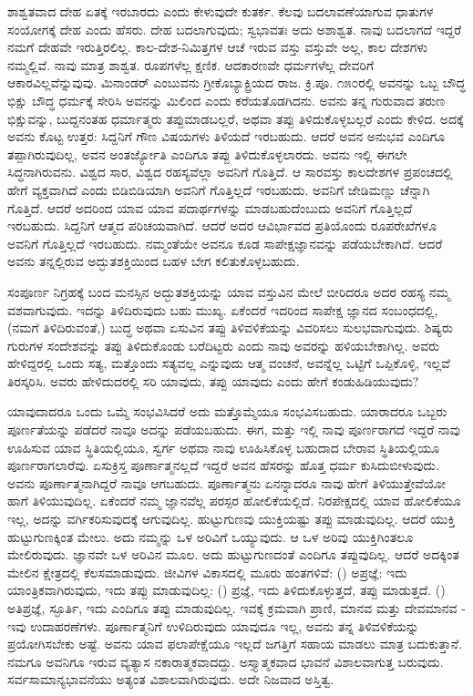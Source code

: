 ಶಾಶ್ವತವಾದ ದೇಹ ಏತಕ್ಕೆ ಇರಬಾರದು ಎಂದು ಕೇಳುವುದೇ ಕುತರ್ಕ. ಕೆಲವು ಬದಲಾವಣೆಯಾಗುವ ಧಾತುಗಳ ಸಂಯೋಗಕ್ಕೆ ದೇಹ ಎಂದು ಹೆಸರು. ದೇಹ ಬದಲಾಗುವುದು; ಸ್ವಭಾವತಃ ಅದು ಅಶಾಶ್ವತ. ನಾವು ಬದಲಾಗದೆ ಇದ್ದರೆ ನಮಗೆ ದೇಹವೇ ಇರುತ್ತಿರಲಿಲ್ಲ. ಕಾಲ-ದೇಶ-ನಿಮಿತ್ತಗಳ ಆಚೆ ಇರುವ ವಸ್ತು ವಸ್ತುವೇ ಅಲ್ಲ, ಕಾಲ ದೇಶಗಳು ನಮ್ಮಲ್ಲಿವೆ. ನಾವು ಮಾತ್ರ ಶಾಶ್ವತ. ರೂಪಗಳೆಲ್ಲ ಕ್ಷಣಿಕ. ಆದಕಾರಣವೇ ಧರ್ಮಗಳೆಲ್ಲ ದೇವರಿಗೆ ಆಕಾರವಿಲ್ಲವೆನ್ನುವುವು. ಮಿನಾಂಡರ್ ಎಂಬುವನು ಗ್ರೀಕೊಬ್ಯಾಕ್ಟ್ರಿಯದ ರಾಜ. ಕ್ರಿ.ಪೂ. ೧೫೦ರಲ್ಲಿ ಅವನನ್ನು ಒಬ್ಬ ಬೌದ್ಧ ಭಿಕ್ಷು ಬೌದ್ಧ ಧರ್ಮಕ್ಕೆ ಸೇರಿಸಿ ಅವನನ್ನು ಮಿಲಿಂದ ಎಂದು ಕರೆಯತೊಡಗಿದನು. ಅವನು ತನ್ನ ಗುರುವಾದ ತರುಣ ಭಿಕ್ಷುವನ್ನು, ಬುದ್ದನಂತಹ ಧರ್ಮಾತ್ಮರು ತಪ್ಪುಮಾಡಬಲ್ಲರೆ, ಅಥವಾ ತಪ್ಪು ತಿಳಿದುಕೊಳ್ಳಬಲ್ಲರೆ ಎಂದು ಕೇಳಿದ. ಅದಕ್ಕೆ ಅವನು ಕೊಟ್ಟ ಉತ್ತರ: ಸಿದ್ದನಿಗೆ ಗೌಣ ವಿಷಯಗಳು ತಿಳಿಯದೆ ಇರಬಹುದು. ಆದರೆ ಅವನ ಅನುಭವ ಎಂದಿಗೂ ತಪ್ಪಾಗಿರುವುದಿಲ್ಲ, ಅವನ ಅಂತರ್ಜ್ಯೋತಿ ಎಂದಿಗೂ ತಪ್ಪು ತಿಳಿದುಕೊಳ್ಳಲಾರದು. ಅವನು ಇಲ್ಲಿ ಈಗಲೇ ಸಿದ್ಧನಾಗಿರುವನು. ವಿಶ್ವದ ಸಾರ, ವಿಶ್ವದ ರಹಸ್ಯವೆಲ್ಲಾ ಅವನಿಗೆ ಗೊತ್ತಿದೆ. ಆ ಸಾರವಸ್ತು ಕಾಲದೇಶಗಳ ಪ್ರಪಂಚದಲ್ಲಿ ಹೇಗೆ ವ್ಯಕ್ತವಾಗಿದೆ ಎಂದು ಬಿಡಿಬಿಡಿಯಾಗಿ ಅವನಿಗೆ ಗೊತ್ತಿಲ್ಲದೆ ಇರಬಹುದು. ಅವನಿಗೆ ಜೇಡಿಮಣ್ಣು ಚೆನ್ನಾಗಿ ಗೊತ್ತಿದೆ. ಆದರೆ ಅದರಿಂದ ಯಾವ ಯಾವ ಪದಾರ್ಥಗಳನ್ನು ಮಾಡಬಹುದೆಂಬುದು ಅವನಿಗೆ ಗೊತ್ತಿಲ್ಲದೆ ಇರಬಹುದು. ಸಿದ್ದನಿಗೆ ಆತ್ಮದ ಪರಿಚಯವಾಗಿದೆ. ಆದರೆ ಅದರ ಆವಿರ್ಭಾವದ ಪ್ರತಿಯೊಂದು ರೂಪರೇಖೆಗಳೂ ಅವನಿಗೆ ಗೊತ್ತಿಲ್ಲದೆ ಇರಬಹುದು. ನಮ್ಮಂತೆಯೇ ಅವನೂ ಕೂಡ ಸಾಪೇಕ್ಷಜ್ಞಾನವನ್ನು ಪಡೆಯಬೇಕಾಗಿದೆ. ಆದರೆ ಅವನು ತನ್ನಲ್ಲಿರುವ ಅದ್ಭುತಶಕ್ತಿಯಿಂದ ಬಹಳ ಬೇಗ ಕಲಿತುಕೊಳ್ಳಬಹುದು.

ಸಂಪೂರ್ಣ ನಿಗ್ರಹಕ್ಕೆ ಬಂದ ಮನಸ್ಸಿನ ಅದ್ಭುತಶಕ್ತಿಯನ್ನು ಯಾವ ವಸ್ತುವಿನ ಮೇಲೆ ಬೀರಿದರೂ ಅದರ ರಹಸ್ಯ ನಮ್ಮ ವಶವಾಗುವುದು. ಇದನ್ನು ತಿಳಿದಿರುವುದು ಬಹು ಮುಖ್ಯ. ಏಕೆಂದರೆ ಇದರಿಂದ ಸಾಪೇಕ್ಷ ಜ್ಞಾನದ ಸಂಬಂಧದಲ್ಲಿ, (ನಮಗೆ ತಿಳಿದಿರುವಂತೆ,) ಬುದ್ಧ ಅಥವಾ ಏಸುವಿನ ತಪ್ಪು ತಿಳಿವಳಿಕೆಯನ್ನು ವಿವರಿಸಲು ಸುಲಭವಾಗುವುದು. ಶಿಷ್ಯರು ಗುರುಗಳ ಸಂದೇಶವನ್ನು ತಪ್ಪು ತಿಳಿದುಕೊಂಡು ಬರೆದಿಟ್ಟರು ಎಂದು ನಾವು ಅವರನ್ನು ಹಳಿಯಬೇಕಾಗಿಲ್ಲ. ಅವರು ಹೇಳಿದ್ದರಲ್ಲಿ ಒಂದು ಸತ್ಯ, ಮತ್ತೊಂದು ಸತ್ಯವಲ್ಲ ಎನ್ನುವುದು ಆತ್ಮ ವಂಚನೆ, ಅವನ್ನೆಲ್ಲ ಒಟ್ಟಿಗೆ ಒಪ್ಪಿಕೊಳ್ಳಿ, ಇಲ್ಲವೆ ತಿರಸ್ಕರಿಸಿ. ಅವರು ಹೇಳಿದುದರಲ್ಲಿ ಸರಿ ಯಾವುದು, ತಪ್ಪು ಯಾವುದು ಎಂದು ಹೇಗೆ ಕಂಡುಹಿಡಿಯುವುದು?

ಯಾವುದಾದರೂ ಒಂದು ಒಮ್ಮೆ ಸಂಭವಿಸಿದರೆ ಅದು ಮತ್ತೊಮ್ಮೆಯೂ ಸಂಭವಿಸಬಹುದು. ಯಾರಾದರೂ ಒಬ್ಬರು ಪೂರ್ಣತೆಯನ್ನು ಪಡೆದರೆ ನಾವೂ ಅದನ್ನು ಪಡೆಯಬಹುದು. ಈಗ, ಮತ್ತು ಇಲ್ಲಿ ನಾವು ಪೂರ್ಣರಾಗದೆ ಇದ್ದರೆ ನಾವು ಊಹಿಸುವ ಯಾವ ಸ್ಥಿತಿಯಲ್ಲಿಯೂ, ಸ್ವರ್ಗ ಅಥವಾ ನಾವು ಊಹಿಸಿಕೊಳ್ಳ ಬಹುದಾದ ಬೇರಾವ ಸ್ಥಿತಿಯಲ್ಲಿಯೂ ಪೂರ್ಣರಾಗಲಾರೆವು. ಏಸುಕ್ರಿಸ್ತ ಪೂರ್ಣಾತ್ಮನಲ್ಲದೆ ಇದ್ದರೆ ಅವನ ಹೆಸರನ್ನು ಹೊತ್ತ ಧರ್ಮ ಕುಸಿದುಬೀಳುವುದು. ಅವನು ಪೂರ್ಣಾತ್ಮನಾಗಿದ್ದರೆ ನಾವೂ ಆಗಬಹುದು. ಪೂರ್ಣಾತ್ಮನು ಏನನ್ನಾದರೂ ನಾವು ಹೇಗೆ ತಿಳಿಯುತ್ತೇವೆಯೋ ಹಾಗೆ ತಿಳಿಯುವುದಿಲ್ಲ. ಏಕೆಂದರೆ ನಮ್ಮ ಜ್ಞಾನವೆಲ್ಲ ಪರಸ್ಪರ ಹೋಲಿಕೆಯಲ್ಲಿದೆ. ನಿರಪೇಕ್ಷದಲ್ಲಿ ಯಾವ ಹೋಲಿಕೆಯೂ ಇಲ್ಲ, ಅದನ್ನು ವರ್ಗಿಕರಿಸುವುದಕ್ಕೆ ಆಗುವುದಿಲ್ಲ. ಹುಟ್ಟುಗುಣವು ಯುಕ್ತಿಯಷ್ಟು ತಪ್ಪು ಮಾಡುವುದಿಲ್ಲ. ಆದರೆ ಯುಕ್ತಿ ಹುಟ್ಟುಗುಣಕ್ಕಿಂತ ಮೇಲು. ಅದು ನಮ್ಮನ್ನು ಒಳ ಅರಿವಿಗೆ ಒಯ್ಯುವುದು. ಆ ಒಳ ಅರಿವು ಯುಕ್ತಿಗಿಂತಲೂ ಮೇಲಿರುವುದು. ಜ್ಞಾನವೇ ಒಳ ಅರಿವಿನ ಮೂಲ. ಅದು ಹುಟ್ಟುಗುಣದಂತೆ ಎಂದಿಗೂ ತಪ್ಪುವುದಿಲ್ಲ. ಆದರೆ ಅದಕ್ಕಿಂತ ಮೇಲಿನ ಕ್ಷೇತ್ರದಲ್ಲಿ ಕೆಲಸಮಾಡುವುದು. ಜೀವಿಗಳ ವಿಕಾಸದಲ್ಲಿ ಮೂರು ಹಂತಗಳಿವೆ: () ಅಪ್ರಜ್ಞೆ: ಇದು ಯಾಂತ್ರಿಕವಾಗಿರುವುದು, ಇದು ತಪ್ಪು ಮಾಡುವುದಿಲ್ಲ: () ಪ್ರಜ್ಞೆ, ಇದು ತಿಳಿದುಕೊಳ್ಳುತ್ತದೆ, ತಪ್ಪು ಮಾಡುತ್ತದೆ. () ಅತಿಪ್ರಜ್ಞೆ, ಸ್ಫೂರ್ತಿ, ಇದು ಎಂದಿಗೂ ತಪ್ಪು ಮಾಡುವುದಿಲ್ಲ. ಇವಕ್ಕೆ ಕ್ರಮವಾಗಿ ಪ್ರಾಣಿ, ಮಾನವ ಮತ್ತು ದೇವಮಾನವ - ಇವು ಉದಾಹರಣೆಗಳು. ಪೂರ್ಣಾತ್ಮನಿಗೆ ಉಳಿದಿರುವುದು ಯಾವುದೂ ಇಲ್ಲ, ಅವನು ತನ್ನ ತಿಳಿವಳಿಕೆಯನ್ನು ಪ್ರಯೋಗಿಸಬೇಕು ಅಷ್ಟೆ. ಅವನು ಯಾವ ಫಲಾಪೇಕ್ಷೆಯೂ ಇಲ್ಲದೆ ಜಗತ್ತಿಗೆ ಸಹಾಯ ಮಾಡಲು ಮಾತ್ರ ಬದುಕುತ್ತಾನೆ. ನಮಗೂ ಅವನಿಗೂ ಇರುವ ವ್ಯತ್ಯಾಸ ನಕಾರಾತ್ಮಕವಾದದ್ದು. ಅಸ್ತ್ಯಾತ್ಮಕವಾದ ಭಾವನೆ ವಿಶಾಲವಾಗುತ್ತ ಬರುವುದು. ಸರ್ವಸಾಮಾನ್ಯಭಾವನೆಯು ಅತ್ಯಂತ ವಿಶಾಲವಾಗಿರುವುದು. ಅದೇ ನಿಜವಾದ ಅಸ್ತಿತ್ವ.

